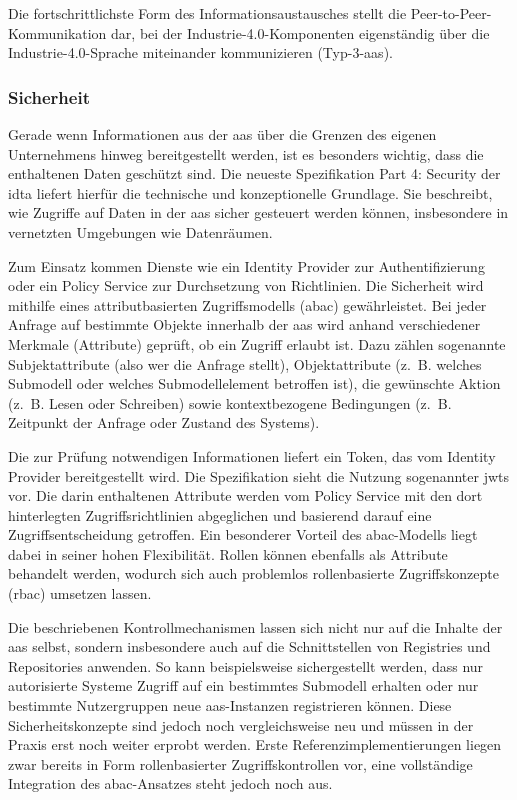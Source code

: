 Die fortschrittlichste Form des Informationsaustausches stellt die Peer-to-Peer-Kommuni\-kation dar, bei der Industrie-4.0-Komponenten eigenständig über die Industrie-4.0-Sprache \cite{I4Sprache} miteinander kommunizieren (Typ-3-\acs{aas}).

\subsubsection{Sicherheit}
\label{sec: Sicherheit}
Gerade wenn Informationen aus der \acs{aas} über die Grenzen des eigenen Unternehmens hinweg bereitgestellt werden, ist es besonders wichtig, dass die enthaltenen Daten geschützt sind. 
Die neueste Spezifikation Part 4: Security \cite{SpezifikationPart4} der \acs{idta} liefert hierfür die technische und konzeptionelle Grundlage.
Sie beschreibt, wie Zugriffe auf Daten in der \acs{aas} sicher gesteuert werden können, insbesondere in vernetzten Umgebungen wie Datenräumen.

Zum Einsatz kommen Dienste wie ein Identity Provider zur Authentifizierung oder ein Policy Service zur Durchsetzung von Richtlinien.
Die Sicherheit wird mithilfe eines attributbasierten Zugriffsmodells (\ac{abac}) gewährleistet.
Bei jeder Anfrage auf bestimmte Objekte innerhalb der \acs{aas} wird anhand verschiedener Merkmale (Attribute) geprüft, ob ein Zugriff erlaubt ist.
Dazu zählen sogenannte Subjekt\-attribute (also wer die Anfrage stellt), Objektattribute (z.~B. welches Submodell oder welches Submodellelement betroffen ist), die gewünschte Aktion (z.~B. Lesen oder Schreiben) sowie kontextbezogene Bedingungen (z.~B. Zeitpunkt der Anfrage oder Zustand des Systems).

Die zur Prüfung notwendigen Informationen liefert ein Token, das vom Identity Provider bereitgestellt wird. 
Die Spezifikation sieht die Nutzung sogenannter \acp{jwt} vor.
Die darin enthaltenen Attribute werden vom Policy Service mit den dort hinterlegten Zugriffsrichtlinien abgeglichen und basierend darauf eine Zugriffsentscheidung getroffen.
Ein besonderer Vorteil des \acs{abac}-Modells liegt dabei in seiner hohen Flexibilität. 
Rollen können ebenfalls als Attribute behandelt werden, wodurch sich auch problemlos rollenbasierte Zugriffskonzepte (\ac{rbac}) umsetzen lassen. 

Die beschriebenen Kontrollmechanismen lassen sich nicht nur auf die Inhalte der \acs{aas} selbst, sondern insbesondere auch auf die Schnittstellen von Registries und Repositories anwenden.
So kann beispielsweise sichergestellt werden, dass nur autorisierte Systeme Zugriff auf ein bestimmtes Submodell erhalten oder nur bestimmte Nutzergruppen neue \acs{aas}-Instanzen registrieren können.
Diese Sicherheitskonzepte sind jedoch noch vergleichsweise neu und müssen in der Praxis erst noch weiter erprobt werden.
Erste Referenzimplementierungen liegen zwar bereits in Form rollenbasierter Zugriffskontrollen vor, eine vollständige Integration des \acs{abac}-Ansatzes steht jedoch noch aus.


